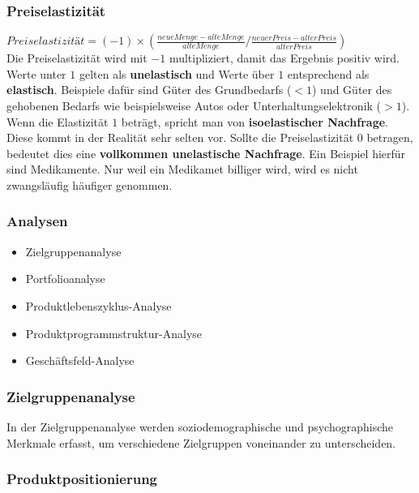 \subsubsection{Preiselastizität}

$Preiselastizität = (-1)\times(\frac{neue Menge - alte Menge}{alte Menge} / \frac{neuer Preis - alter Preis}{alter Preis})$\\
Die Preiselastizität wird mit $-1$ multipliziert, damit das Ergebnis positiv wird. Werte unter $1$ gelten als {\bf unelastisch} und Werte über $1$ entsprechend als {\bf elastisch}. Beispiele dafür sind Güter des Grundbedarfs ($<1$) und Güter des gehobenen Bedarfs wie beispielsweise Autos oder Unterhaltungselektronik ($>1$). Wenn die Elastizität $1$ beträgt, spricht man von {\bf isoelastischer Nachfrage}. Diese kommt in der Realität sehr selten vor. Sollte die Preiselastizität $0$ betragen, bedeutet dies eine {\bf vollkommen unelastische Nachfrage}. Ein Beispiel hierfür sind Medikamente. Nur weil ein Medikamet billiger wird, wird es nicht zwangsläufig häufiger genommen.

\subsubsection{Analysen}

\begin{itemize}
	\item Zielgruppenanalyse
	\item Portfolioanalyse
	\item Produktlebenszyklus-Analyse
	\item Produktprogrammstruktur-Analyse
	\item Geschäftsfeld-Analyse
\end{itemize}

\subsubsection{Zielgruppenanalyse}

In der Zielgruppenanalyse werden soziodemographische und psychographische Merkmale erfasst, um verschiedene Zielgruppen voneinander zu unterscheiden.

\subsubsection{Produktpositionierung}

